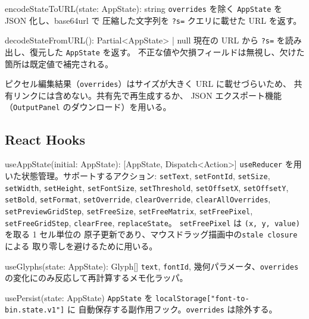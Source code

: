 \begin{funcblock}{encodeStateToURL(state: AppState): string}
\texttt{overrides} を除く \texttt{AppState} を JSON 化し、base64url で
圧縮した文字列を \texttt{?s=} クエリに載せた URL を返す。
\end{funcblock}

\begin{funcblock}{decodeStateFromURL(): Partial<AppState> | null}
現在の URL から \texttt{?s=} を読み出し、復元した \texttt{AppState} を返す。
不正な値や欠損フィールドは無視し、欠けた箇所は既定値で補完される。
\end{funcblock}

\begin{notebox}
ピクセル編集結果（\texttt{overrides}）はサイズが大きく URL に載せづらいため、
共有リンクには含めない。共有先で再生成するか、
JSON エクスポート機能（\texttt{OutputPanel} のダウンロード）を用いる。
\end{notebox}

\subsection{React Hooks}

\begin{funcblock}{useAppState(initial: AppState): [AppState, Dispatch<Action>]}
\texttt{useReducer} を用いた状態管理。サポートするアクション:
\texttt{setText}, \texttt{setFontId}, \texttt{setSize},
\texttt{setWidth}, \texttt{setHeight}, \texttt{setFontSize},
\texttt{setThreshold}, \texttt{setOffsetX}, \texttt{setOffsetY},
\texttt{setBold}, \texttt{setFormat}, \texttt{setOverride},
\texttt{clearOverride}, \texttt{clearAllOverrides},
\texttt{setPreviewGridStep},
\texttt{setFreeSize}, \texttt{setFreeMatrix}, \texttt{setFreePixel},
\texttt{setFreeGridStep}, \texttt{clearFree},
\texttt{replaceState}。
\texttt{setFreePixel} は \texttt{(x, y, value)} を取る 1 セル単位の
原子更新であり、マウスドラッグ描画中の\texttt{stale closure}による
取り零しを避けるために用いる。
\end{funcblock}

\begin{funcblock}{useGlyphs(state: AppState): Glyph[]}
\texttt{text}, \texttt{fontId}, 幾何パラメータ、\texttt{overrides}
の変化にのみ反応して再計算するメモ化ラッパ。
\end{funcblock}

\begin{funcblock}{usePersist(state: AppState)}
\texttt{AppState} を \texttt{localStorage["font-to-bin.state.v1"]} に
自動保存する副作用フック。\texttt{overrides} は除外する。
\end{funcblock}

\newpage
